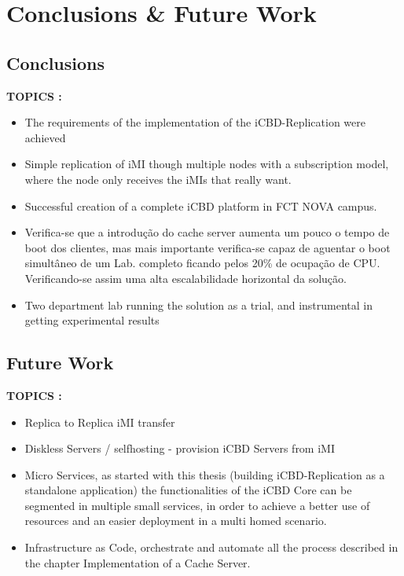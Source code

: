 \chapter{Conclusions \& Future Work}
\label{cha:conclusion}

\section{Conclusions}
\label{sec:con_conclusions}

\textbf{TOPICS :}
\begin{itemize}
	\item The requirements of the implementation of the iCBD-Replication were achieved 
	\item Simple replication of iMI though multiple nodes with a subscription model, where the node only receives the iMIs that really want.
	\item Successful creation of a complete iCBD platform in FCT NOVA campus.
	\item Verifica-se que a introdução do cache server aumenta um pouco o tempo de boot dos clientes, mas mais importante verifica-se capaz de aguentar o boot simultâneo de um Lab. completo ficando pelos 20\% de ocupação de CPU. Verificando-se assim uma alta escalabilidade horizontal da solução.
	\item Two department lab running the solution as a trial, and instrumental in getting experimental results
\end{itemize}



\section{Future Work}
\label{sec:con_future_work}

\textbf{TOPICS :}
\begin{itemize}
	\item Replica to Replica iMI transfer
	\item Diskless Servers / selfhosting - provision iCBD Servers from iMI
	\item Micro Services, as started with this thesis (building iCBD-Replication as a standalone application) the functionalities of the iCBD Core can be segmented in multiple small services, in order to achieve a better use of resources and an easier deployment in a multi homed scenario.
	\item Infrastructure as Code, orchestrate and automate all the process described in the chapter Implementation of a Cache Server.
\end{itemize}




